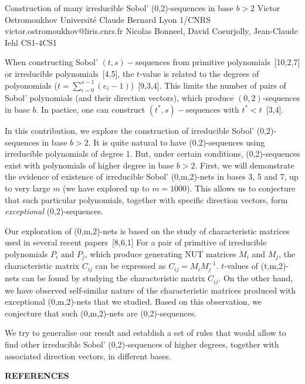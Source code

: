 \begin{talk}
  { Construction of many irreducible Sobol’ {(0,2)}-sequences in base $b>2$ }%
  {Victor Ostromoukhov}%
  {Université Claude Bernard Lyon 1/CNRS}%
  {victor.ostromoukhov@liris.cnrs.fr}%
  {Nicolas Bonneel, David Coeurjolly, Jean-Claude Iehl}%
{}{}{CS1-4}{CS1}


When constructing Sobol' $(t,s)-$sequences  from primitive polynomials~[10,2,7] or irreducible polynomials~[4,5], the $t$-value  is related to the degrees of polyonomials ($t=\sum_{i=0}^{s-1}(e_i-1)$)~[9,3,4]. 
This limits the number of pairs of Sobol' polynomials (and their direction vectors), which produce $(0,2)$-sequences in base $b$. In pactice, one can construct $(t^*,s)-$sequences with $t^*<t$~[3,4]. 

In this contribution, we  explore the construction of irreducible Sobol’ (0,2)-sequences in base $b>2$.
It is quite natural to have (0,2)-sequences using irreducible polynomials of degree 1.
But, under certain conditions, (0,2)-sequences exist with polynomials of higher degree in base $b>2$.
First, we will demonstrate the evidence of existence of irreducible Sobol’ (0,m,2)-nets in bases 3, 5 and 7, up to very large $m$ (we have explored up to $m=1000$).
This allows us to conjecture that such particular polynomials, together with specific direction vectors, form {\it exceptional} (0,2)-sequences.

Our exploration of  (0,m,2)-nets is based on the study of characteristic matrices used in several recent papers~[8,6,1] 
For a pair of primitive of irreducible polynomials $P_i$ and $P_j$, which produce generating NUT matrices $M_i$ and $M_j$, the characteristic matrix $C_{ij}$ can be expressed
as $C_{ij} = M_{i}M_j^{-1}$. $t$-values of (t,m,2)-nets can be found by studying the characteristic matrix $C_{ij}$.
On the other hand, we have observed self-similar nature of the characteristic matrices produced with exceptional (0,m,2)-nets that we studied.
Based on this observation, we conjecture that such (0,m,2)-nets are (0,2)-sequences.

We try to generalise our result and establish a set of rules that would allow to find other irreducible Sobol’ {(0,2)}-sequences of higher degrees, together with associated direction vectors, in different bases.



\textbf{REFERENCES}


\end{talk}
